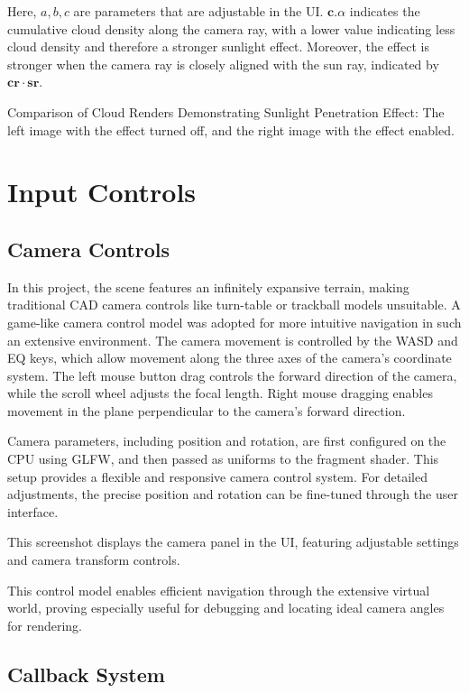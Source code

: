 Here, $a,b,c$ are parameters that are adjustable in the UI. $\mathbf{c}.\alpha$ indicates the cumulative cloud density along the camera ray, with a lower value indicating less cloud density and therefore a stronger sunlight effect. Moreover, the effect is stronger when the camera ray is closely aligned with the sun ray, indicated by $\mathbf{cr}\cdot \mathbf{sr}$.

{Comparison of Cloud Renders Demonstrating Sunlight Penetration Effect: The left image with the effect turned off, and the right image with the effect enabled.}


\section{Input Controls}

\subsection{Camera Controls}

In this project, the scene features an infinitely expansive terrain, making traditional CAD camera controls like turn-table or trackball models unsuitable. A game-like camera control model was adopted for more intuitive navigation in such an extensive environment. The camera movement is controlled by the WASD and EQ keys, which allow movement along the three axes of the camera's coordinate system. The left mouse button drag controls the forward direction of the camera, while the scroll wheel adjusts the focal length. Right mouse dragging enables movement in the plane perpendicular to the camera's forward direction. 

Camera parameters, including position and rotation, are first configured on the CPU using GLFW, and then passed as uniforms to the fragment shader. This setup provides a flexible and responsive camera control system. For detailed adjustments, the precise position and rotation can be fine-tuned through the user interface.

{This screenshot displays the camera panel in the UI, featuring adjustable settings and camera transform controls.}

This control model enables efficient navigation through the extensive virtual world, proving especially useful for debugging and locating ideal camera angles for rendering.

\subsection{Callback System}

